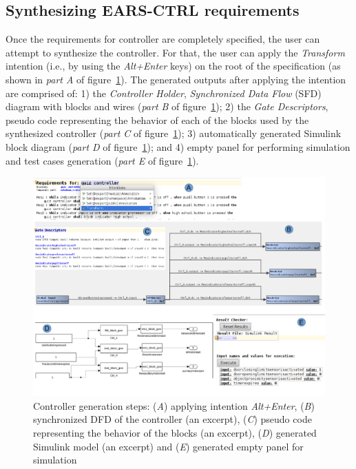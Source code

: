 \subsection{Synthesizing \textsf{EARS-CTRL} requirements}
\label{SynthReq}
\vspace{-.3cm}
Once the requirements for controller are completely specified, the user can
attempt to synthesize the controller. For that, the user can apply the
\emph{Transform} intention (i.e., by using the \emph{Alt+Enter} keys) on the root of the specification (as
shown in \emph{part A} of figure~\ref{fig:Spec_transform}). The generated outputs after applying the
intention are comprised of: 1) the \emph{Controller Holder},
\emph{Synchronized Data Flow} (SFD) diagram with blocks and wires
(\emph{part B} of figure~\ref{fig:Spec_transform}); 2) the \emph{Gate Descriptors}, pseudo
code representing the behavior of each of the blocks used by the synthesized controller (\emph{part C} of
figure~\ref{fig:Spec_transform}); 3) automatically generated Simulink block
diagram (\emph{part D} of
figure~\ref{fig:Spec_transform}); and 4) empty panel for performing simulation
and test cases generation (\emph{part E} of
figure~\ref{fig:Spec_transform}).
\begin{figure}[!h]
\centering
\includegraphics[width=1\textwidth]{./images/Transform.png}
\caption{Controller generation steps: (\emph{A}) applying intention \emph{Alt+Enter},
(\emph{B}) synchronized DFD of the controller (an excerpt), (\emph{C}) pseudo
code representing the behavior of the blocks (an excerpt), (\emph{D})
generated Simulink model (an excerpt) and (\emph{E})
generated empty panel for simulation}
\label{fig:Spec_transform}
\end{figure}
\vspace{-.5cm}
